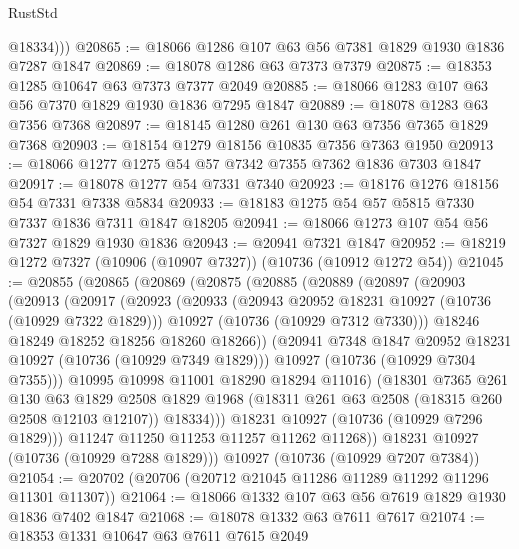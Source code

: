 \begin{lexlean}{RustStd}
\begin{coremodule}
          @18334)))
@20865 := @18066 @1286 @107 @63 @56 @7381 @1829 @1930 @1836 @7287 @1847
@20869 := @18078 @1286 @63 @7373 @7379
@20875 := @18353 @1285 @10647 @63 @7373 @7377 @2049
@20885 := @18066 @1283 @107 @63 @56 @7370 @1829 @1930 @1836 @7295 @1847
@20889 := @18078 @1283 @63 @7356 @7368
@20897 := @18145 @1280 @261 @130 @63 @7356 @7365 @1829 @7368
@20903 := @18154 @1279 @18156 @10835 @7356 @7363 @1950
@20913 := @18066 @1277 @1275 @54 @57 @7342 @7355 @7362 @1836 @7303 @1847
@20917 := @18078 @1277 @54 @7331 @7340
@20923 := @18176 @1276 @18156 @54 @7331 @7338 @5834
@20933 := @18183 @1275 @54 @57 @5815 @7330 @7337 @1836 @7311 @1847 @18205
@20941 := @18066 @1273 @107 @54 @56 @7327 @1829 @1930 @1836
@20943 := @20941 @7321 @1847
@20952 := @18219 @1272 @7327 (@10906 (@10907 @7327)) (@10736 (@10912 @1272 @54))
@21045 := @20855
    (@20865
      (@20869
        (@20875
          (@20885
            (@20889
              (@20897
                (@20903
                  (@20913
                    (@20917
                      (@20923
                        (@20933
                          (@20943 @20952 @18231 @10927 (@10736 (@10929 @7322 @1829)))
                          @10927
                          (@10736 (@10929 @7312 @7330)))
                        @18246
                        @18249
                        @18252
                        @18256
                        @18260
                        @18266))
                    (@20941 @7348 @1847 @20952 @18231 @10927 (@10736 (@10929 @7349 @1829)))
                    @10927
                    (@10736 (@10929 @7304 @7355)))
                  @10995
                  @10998
                  @11001
                  @18290
                  @18294
                  @11016)
                (@18301
                  @7365
                  @261
                  @130
                  @63
                  @1829
                  @2508
                  @1829
                  @1968
                  (@18311 @261 @63 @2508 (@18315 @260 @2508 @12103 @12107))
                  @18334)))
            @18231
            @10927
            (@10736 (@10929 @7296 @1829)))
          @11247
          @11250
          @11253
          @11257
          @11262
          @11268))
      @18231
      @10927
      (@10736 (@10929 @7288 @1829)))
    @10927
    (@10736 (@10929 @7207 @7384))
@21054 := @20702 (@20706 (@20712 @21045 @11286 @11289 @11292 @11296 @11301 @11307))
@21064 := @18066 @1332 @107 @63 @56 @7619 @1829 @1930 @1836 @7402 @1847
@21068 := @18078 @1332 @63 @7611 @7617
@21074 := @18353 @1331 @10647 @63 @7611 @7615 @2049

\end{coremodule}
\end{lexlean}
